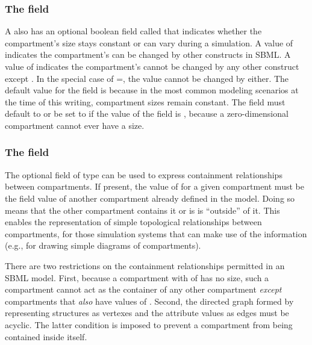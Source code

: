 \subsubsection{The  field}
\label{sec:compartment-constant}

A \Compartment also has an optional boolean field called
 that indicates whether the compartment's size
stays constant or can vary during a simulation.  A value of
 indicates the compartment's  can be
changed by other constructs in SBML.  A value of 
indicates the compartment's  cannot be changed by any
other construct except \InitialAssignment.  In the special case of
=, the value cannot be changed by
\InitialAssignment either.  The default value for the
 field is  because in the most common
modeling scenarios at the time of this writing, compartment sizes
remain constant.  The  field must default to or be
set to  if the value of the 
field is , because a zero-dimensional compartment cannot
ever have a size.


\subsubsection{The  field}
\label{sec:compartment-outside}

The optional field  of type  can be
used to express containment relationships between compartments. If
present, the value of  for a given compartment must
be the  field value of another compartment already
defined in the model.  Doing so means that the other compartment
contains it or is is ``outside'' of it.  This enables the
representation of simple topological relationships between
compartments, for those simulation systems that can make use of
the information (e.g., for drawing simple diagrams of
compartments).

There are two restrictions on the containment relationships
permitted in an SBML model.  First, because a compartment with
 of  has no size, such a
compartment cannot act as the container of any other compartment
\emph{except} compartments that \emph{also} have
 values of .  Second, the directed
graph formed by representing \Compartment structures as vertexes
and the  attribute values as edges must be acyclic.
The latter condition is imposed to prevent a compartment from
being contained inside itself.


